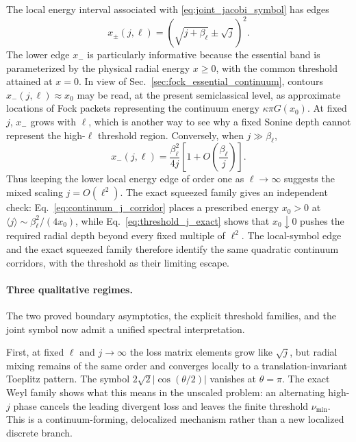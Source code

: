 \documentclass[11pt]{article}
\numberwithin{equation}{section}
\theoremstyle{definition}
\begin{document}
The local energy interval associated with
\eqref{eq:joint_jacobi_symbol} has edges
\begin{equation}
 \boxed{
 x_\pm(j,\ell)
 =
 \left(\sqrt{j+\beta_\ell}\pm\sqrt j\right)^2.
 }
 \label{eq:xpm_joint}
\end{equation}
The lower edge $x_-$ is particularly informative because the essential band
is parameterized by the physical radial energy $x\ge0$, with the common
threshold attained at $x=0$.  In view of
Sec.~\ref{sec:fock_essential_continuum}, contours $x_-(j,\ell)\approx x_0$
may be read, at the present semiclassical level, as approximate locations of
Fock packets representing the continuum energy $\kappa\pi G(x_0)$.  At fixed
$j$, $x_-$ grows with $\ell$, which is another way to see why a fixed Sonine
depth cannot represent the high-$\ell$ threshold region.  Conversely, when
$j\gg\beta_\ell$,
\begin{equation}
 x_-(j,\ell)
 =
 \frac{\beta_\ell^2}{4j}
 \left[1+O\!\left(\frac{\beta_\ell}{j}\right)\right].
 \label{eq:xminus_mixed_scaling}
\end{equation}
Thus keeping the lower local energy edge of order one as $\ell\to\infty$
suggests the mixed scaling $j=O(\ell^2)$.  The exact squeezed family gives an
independent check: Eq.~\eqref{eq:continuum_j_corridor} places a prescribed
energy $x_0>0$ at
$\langle j\rangle\sim\beta_\ell^2/(4x_0)$, while
Eq.~\eqref{eq:threshold_j_exact} shows that $x_0\downarrow0$ pushes the
required radial depth beyond every fixed multiple of $\ell^2$.  The
local-symbol edge and the exact squeezed family therefore identify the same
quadratic continuum corridors, with the threshold as their limiting escape.

\paragraph{Three qualitative regimes.}
The two proved boundary asymptotics, the explicit threshold families, and the
joint symbol now admit a unified spectral interpretation.

First, at fixed $\ell$ and $j\to\infty$ the loss matrix elements grow like
$\sqrt j$, but radial mixing remains of the same order and converges locally to
a translation-invariant Toeplitz pattern.  The symbol
$2\sqrt2|\cos(\theta/2)|$ vanishes at $\theta=\pi$.  The exact Weyl family
shows what this means in the unscaled problem: an alternating high-$j$ phase
cancels the leading divergent loss and leaves the finite threshold
$\nu_{\min}$.  This is a continuum-forming, delocalized mechanism rather than
a new localized discrete branch.
\end{document}

